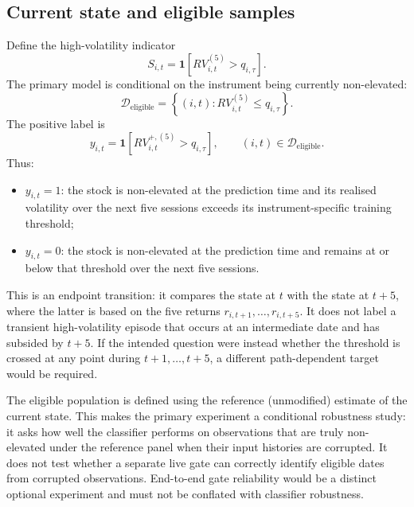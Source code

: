 \documentclass[11pt,a4paper]{article}
\begin{document}
\subsection{Current state and eligible samples}

Define the high-volatility indicator
\begin{equation}
  S_{i,t}=\mathbf{1}\!\left[RV_{i,t}^{(5)}>q_{i,\tau}\right].
  \label{eq:state}
\end{equation}
The primary model is conditional on the instrument being currently non-elevated:
\begin{equation}
  \mathcal{D}_{\mathrm{eligible}}=
  \left\{(i,t):RV_{i,t}^{(5)}\le q_{i,\tau}\right\}.
\end{equation}
The positive label is
\begin{equation}
  \boxed{
  y_{i,t}=\mathbf{1}\!\left[RV_{i,t}^{+,(5)}>q_{i,\tau}\right],
  \qquad (i,t)\in\mathcal{D}_{\mathrm{eligible}}.
  }
  \label{eq:target}
\end{equation}
Thus:
\begin{itemize}
  \item $y_{i,t}=1$: the stock is non-elevated at the prediction time and its realised volatility over the next five sessions exceeds its instrument-specific training threshold;
  \item $y_{i,t}=0$: the stock is non-elevated at the prediction time and remains at or below that threshold over the next five sessions.
\end{itemize}

This is an endpoint transition: it compares the state at $t$ with the state at $t+5$, where the latter is based on the five returns $r_{i,t+1},\ldots,r_{i,t+5}$. It does not label a transient high-volatility episode that occurs at an intermediate date and has subsided by $t+5$. If the intended question were instead whether the threshold is crossed at any point during $t+1,\ldots,t+5$, a different path-dependent target would be required.

The eligible population is defined using the reference (unmodified) estimate of the current state. This makes the primary experiment a conditional robustness study: it asks how well the classifier performs on observations that are truly non-elevated under the reference panel when their input histories are corrupted. It does not test whether a separate live gate can correctly identify eligible dates from corrupted observations. End-to-end gate reliability would be a distinct optional experiment and must not be conflated with classifier robustness.
\end{document}

